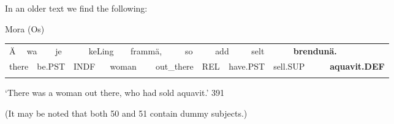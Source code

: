 \begin{styleBodyTextFirst}
In an older text we find the following:

\end{styleBodyTextFirst}

\begin{listWWNumileveli}
\item {}

\begin{styleExample}
\label{bkm:Ref123968062}Mora (Os)

\end{styleExample}

\end{listWWNumileveli}

\begin{tabular}{llllllllllllllllll}
\lsptoprule
Ä & \multicolumn{2}{l}{wa

} & \multicolumn{2}{l}{je

} & \multicolumn{2}{l}{keLing

} & \multicolumn{2}{l}{frammä,

} & \multicolumn{2}{l}{so

} & \multicolumn{2}{l}{add

} & \multicolumn{2}{l}{selt

} & \multicolumn{2}{l}{{\bfseries brendunä.}

} & \\
\multicolumn{2}{l}{there

} & \multicolumn{2}{l}{be.PST

} & \multicolumn{2}{l}{INDF

} & \multicolumn{2}{l}{woman

} & \multicolumn{2}{l}{out\_there

} & \multicolumn{2}{l}{REL

} & \multicolumn{2}{l}{have.PST

} & \multicolumn{2}{l}{sell.SUP

} & \multicolumn{2}{l}{{\bfseries aquavit.DEF}

}\\
\lspbottomrule
\end{tabular}

\begin{styleTranslation}
‘There was a woman out there, who had sold aquavit.’ 391

\end{styleTranslation}

\begin{styleBodyTextFirst}
(It may be noted that both 50 and 51 contain dummy subjects.)

\end{styleBodyTextFirst}


